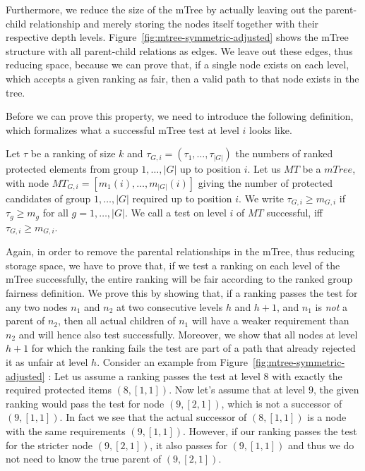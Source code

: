 Furthermore, we reduce the size of the mTree by actually leaving out the parent-child relationship and merely storing the nodes itself together with their respective depth levels.
%
Figure~\ref{fig:mtree-symmetric-adjusted} %
shows the mTree structure with all parent-child relations as edges.
%
We leave out these edges, thus reducing space, because we can prove that, if a single node exists on each level, which accepts a given ranking as fair, then a valid path to that node exists in the tree.

Before we can prove this property, we need to introduce the following definition, which formalizes what a successful mTree test at level $i$ looks like.
%
\begin{definition}
\label{def:valid-mtree-test}
Let $\tau$ be a ranking of size $k$ and $\tau_{G,i}=(\tau_{1},\ldots,\tau_{|G|})$ the numbers of ranked protected elements from group $1,\ldots,|G|$ up to position $i$.
%
Let us  $MT$ be a $mTree$, with node $MT_{G,i}=[m_1(i),\ldots,m_{|G|}(i)]$ giving the number of protected candidates of group $1,\ldots,|G|$ required up to position $i$.
%
We write $\tau_{G,i} \geq m_{G,i}$ if $\tau_g \geq m_g$ for all $g=1,\ldots,|G|$.
%
We call a test on level $i$ of $MT$ successful, iff $\tau_{G,i} \geq m_{G,i}$.
\end{definition}
%
Again, in order to remove the parental relationships in the mTree, thus reducing storage space, we have to prove that, if we test a ranking on each level of the mTree successfully, the entire ranking will be fair according to the ranked group fairness definition.
%
We prove this by showing that, if a ranking passes the test for any two nodes $n_1$ and $n_2$ at two consecutive levels $h$ and $h+1$, and $n_1$ is \emph{not} a parent of $n_2$, then all actual children of $n_1$ will have a weaker requirement than $n_2$ and will hence also test successfully.
%
Moreover, we show that all nodes at level $h+1$ for which the ranking fails the test are part of a path that already rejected it as unfair at level $h$.
%
Consider an example from Figure~\ref{fig:mtree-symmetric-adjusted} : Let us assume a ranking passes the test at level $8$ with exactly the required protected items $(8, [1,1])$.
%
Now let's assume that at level $9$, the given ranking would pass the test for node $(9, [2,1])$, which is not a successor of $(9, [1,1])$.
%
In fact we see that the actual successor of $(8, [1,1])$ is a node with the same requirements $(9, [1,1])$.
%
However, if our ranking passes the test for the stricter node $(9, [2,1])$, it also passes for $(9, [1,1])$ and thus we do not need to know the true parent of $(9, [2,1])$.
